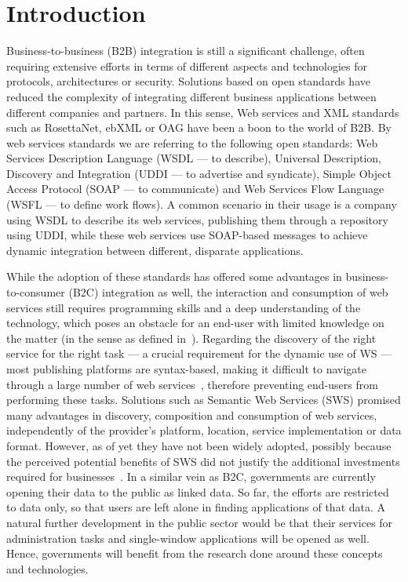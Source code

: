 
\section{Introduction}
\label{sec:introduction}

Business-to-business (B2B) integration is still a significant challenge, often requiring extensive efforts in terms of different aspects and technologies for protocols, architectures or security. Solutions based on open standards have reduced the complexity of integrating different business applications between different companies and partners. 
In this sense, Web services and XML standards such as RosettaNet, ebXML or OAG have been a boon to the world of B2B. By web services standards we are referring to the following open standards: Web Services Description Language (WSDL --- to describe), Universal Description, Discovery and Integration (UDDI --- to advertise and syndicate), Simple Object Access Protocol (SOAP --- to communicate) and Web Services Flow Language (WSFL --- to define work flows). 
A common scenario  in their usage is a company using WSDL to describe its web services, publishing them through a repository using UDDI, while these web services use SOAP-based messages to achieve dynamic integration between different, disparate applications.

While the adoption of these standards has offered some advantages in business-to-consumer (B2C) integration as well,  the interaction and consumption of web services still requires programming skills and a deep understanding of the  technology, which poses an obstacle for an end-user with limited knowledge on the matter (in the sense as defined in~\cite{fuchsloch2010}). 
Regarding the discovery of the right service for the right task --- a crucial requirement for the dynamic use of WS --- most publishing platforms are syntax-based, %
making it difficult to navigate through a large number of web services~\cite{pilioura_acm2009}, 
therefore preventing end-users from performing these tasks. 
Solutions such as Semantic Web Services (SWS) promised many advantages in discovery, composition and consumption of web services, independently of the provider's platform, location, service implementation or data format. 
However, as of yet they have not been widely adopted, 
possibly because the perceived potential benefits of SWS did not justify the additional investments required for businesses~\cite{shi2007}.
In a similar vein as B2C, governments are currently opening their data to the public as linked data. 
So far, the efforts are restricted to data only, so that users are left alone in finding applications of that data. 
A natural further development in the public sector would be that their services for administration tasks and single-window applications will be opened as well. Hence, governments will benefit from the research done around these concepts and technologies.

